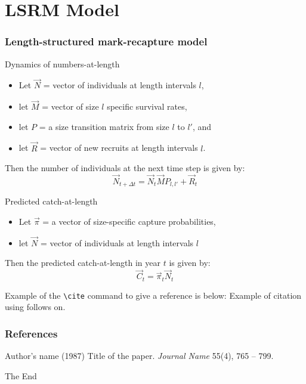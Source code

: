 \documentclass{beamer}
\begin{document}
\section{LSRM Model} %
\label{sec:lsrm_model}
\begin{frame}
	\frametitle{Length-structured mark-recapture model}
	
	{
		\begin{block} {Dynamics of numbers-at-length}
			\begin{itemize}
				\item Let $\vec{N}$ = vector of individuals at length intervals $l$,
				\item let $\vec{M}$ = vector of size $l$ specific survival rates,
				\item let $P$ = a size transition matrix from size $l$ to $l'$, and
				\item let $\vec{R}$ = vector of new recruits at length intervals $l$.
			\end{itemize}
			Then the number of individuals at the next time step is given by:
			\[ \vec{N}_{t+\Delta t} = \vec{N}_t \vec{M} P_{l,l'} + \vec{R}_t\]
			
		\end{block}
	}
	{
		\begin{block} {Predicted catch-at-length}
			\begin{itemize}
				\item Let $\vec{\pi}$ = a vector of size-specific capture probabilities,
				\item let $\vec{N}$ = vector of individuals at length intervals $l$
			\end{itemize}
			Then the predicted catch-at-length in year $t$ is given by:
			\[
				\vec{C}_t  = \vec{\pi}_t \vec{N}_t
			\]
			
		\end{block}
	}
	
	
\end{frame}


% 
\begin{frame}[fragile]  %
Example of the \verb|\cite| command to give a reference is below:
Example of citation using \cite{key1} follows on.
\end{frame}
 
\begin{frame}
\frametitle{References}
\footnotesize{
\begin{thebibliography}{99}
  Author's name (1987)
 \newblock Title of the paper.
 \newblock \emph{Journal Name} 55(4), 765 -- 799.
\end{thebibliography}
}
\end{frame}
 
\begin{frame}
\centerline{The End}
\end{frame}
\end{document}
